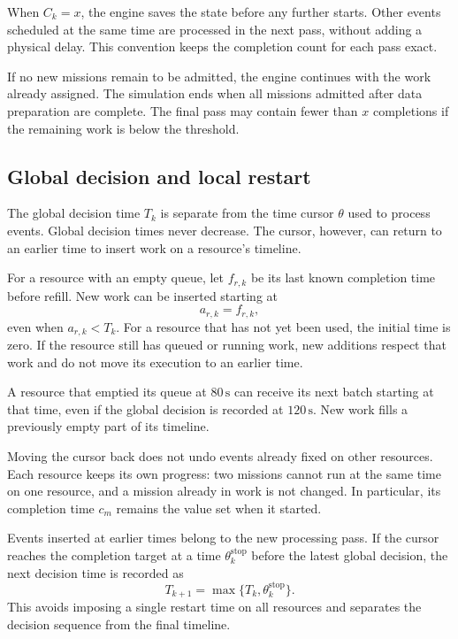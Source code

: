 When $C_k=x$, the engine saves the state before any further starts. Other events
scheduled at the same time are processed in the next pass, without adding a
physical delay. This convention keeps the completion count for each pass exact.

If no new missions remain to be admitted, the engine continues with the work
already assigned. The simulation ends when all missions admitted after data
preparation are complete. The final pass may contain fewer than $x$ completions
if the remaining work is below the threshold.

\subsection{Global decision and local restart}

The global decision time $T_k$ is separate from the time cursor $\theta$ used
to process events. Global decision times never decrease. The cursor, however,
can return to an earlier time to insert work on a resource's timeline.

For a resource with an empty queue, let $f_{r,k}$ be its last known completion
time before refill. New work can be inserted starting at
\begin{equation}
    a_{r,k}=f_{r,k},
    \label{eq:ripartenza-locale}
\end{equation}
even when $a_{r,k}<T_k$. For a resource that has not yet been used, the initial
time is zero. If the resource still has queued or running work, new additions
respect that work and do not move its execution to an earlier time.

\begin{example}
    A resource that emptied its queue at $80\,\mathrm{s}$ can receive its next
    batch starting at that time, even if the global decision is recorded at
    $120\,\mathrm{s}$. New work fills a previously empty part of its timeline.
\end{example}

\noindent Moving the cursor back does not undo events already fixed on other
resources. Each resource keeps its own progress: two missions cannot run at the
same time on one resource, and a mission already in work is not changed.
In particular, its completion time $c_m$ remains the value set when it started.

Events inserted at earlier times belong to the new processing pass. If the
cursor reaches the completion target at a time $\theta_k^{\mathrm{stop}}$
before the latest global decision, the next decision time is recorded as
\begin{equation}
    T_{k+1}=\max\{T_k,\theta_k^{\mathrm{stop}}\}.
    \label{eq:decisione-globale}
\end{equation}
This avoids imposing a single restart time on all resources and separates the
decision sequence from the final timeline.

